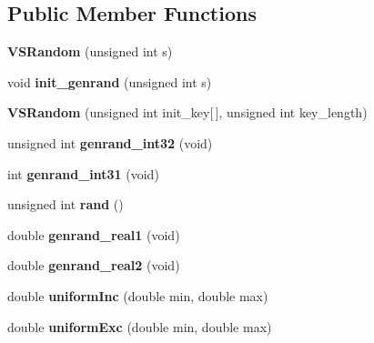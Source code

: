 \subsection*{Public Member Functions}
\begin{DoxyCompactItemize}
\item 
{\bfseries V\+S\+Random} (unsigned int s)\hypertarget{classVSRandom_a865653d21946956ac7d3777b9a3babcc}{}\label{classVSRandom_a865653d21946956ac7d3777b9a3babcc}

\item 
void {\bfseries init\+\_\+genrand} (unsigned int s)\hypertarget{classVSRandom_a7d9d80acd9bce182bd3466bfa6d12d03}{}\label{classVSRandom_a7d9d80acd9bce182bd3466bfa6d12d03}

\item 
{\bfseries V\+S\+Random} (unsigned int init\+\_\+key\mbox{[}$\,$\mbox{]}, unsigned int key\+\_\+length)\hypertarget{classVSRandom_aafa4bbfee95126f2d25117d3b647ee74}{}\label{classVSRandom_aafa4bbfee95126f2d25117d3b647ee74}

\item 
unsigned int {\bfseries genrand\+\_\+int32} (void)\hypertarget{classVSRandom_ac788e64f5ea7f6bcff23ae441ab34b70}{}\label{classVSRandom_ac788e64f5ea7f6bcff23ae441ab34b70}

\item 
int {\bfseries genrand\+\_\+int31} (void)\hypertarget{classVSRandom_ab443ec6b11434f6554599ac50dea4ed4}{}\label{classVSRandom_ab443ec6b11434f6554599ac50dea4ed4}

\item 
unsigned int {\bfseries rand} ()\hypertarget{classVSRandom_a60d958e9de78396570387eecc33acd2a}{}\label{classVSRandom_a60d958e9de78396570387eecc33acd2a}

\item 
double {\bfseries genrand\+\_\+real1} (void)\hypertarget{classVSRandom_acb286b67a097843bfe13b4ccb2d940ca}{}\label{classVSRandom_acb286b67a097843bfe13b4ccb2d940ca}

\item 
double {\bfseries genrand\+\_\+real2} (void)\hypertarget{classVSRandom_ab885864050c09af451d4f830340eb9b4}{}\label{classVSRandom_ab885864050c09af451d4f830340eb9b4}

\item 
double {\bfseries uniform\+Inc} (double min, double max)\hypertarget{classVSRandom_ab472c1a58fae7349058ce46422bba388}{}\label{classVSRandom_ab472c1a58fae7349058ce46422bba388}

\item 
double {\bfseries uniform\+Exc} (double min, double max)\hypertarget{classVSRandom_a963a2296adb8614ea22a41a23e92810d}{}\label{classVSRandom_a963a2296adb8614ea22a41a23e92810d}


\end{DoxyCompactItemize}
